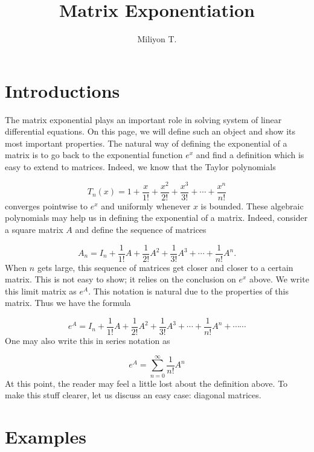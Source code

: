 \documentclass[11pt]{article}
\theoremstyle{definition}
\theoremstyle{plain}
\begin{document}
\clearpage

\title{Matrix Exponentiation}
\author{Miliyon T.}
\maketitle
\section{Introductions}

The matrix exponential plays an important role in solving system of linear differential equations. On this page, we will define such an object and show its most important properties. The natural way of defining the exponential of a matrix is to go back to the exponential function $e^x$ and find a definition which is easy to extend to matrices. Indeed, we know that the Taylor polynomials

\[T_n(x) = 1 + \frac{x}{1!}+ \frac{x^2}{2!}+ \frac{x^3}{3!}+\cdots+ \frac{x^n}{n!}\]
converges pointwise to $e^x$ and uniformly whenever $x$ is bounded. These algebraic polynomials may help us in defining the exponential of a matrix. Indeed, consider a square matrix $A$ and define the sequence of matrices

\[
A_n = I_n + \frac{1}{1!}A+ \frac{1}{2!}A^2+ \frac{1}{3!}A^3+\cdots+ \frac{1}{n!}A^n.
\]
When $n$ gets large, this sequence of matrices get closer and closer to a certain matrix. This is not easy to show; it relies on the conclusion on $e^x$ above. We write this limit matrix as $e^A$. This notation is natural due to the properties of this matrix. Thus we have the formula

\[
e^A = I_n + \frac{1}{1!}A+ \frac{1}{2!}A^2+ \frac{1}{3!}A^3+\cdots+ \frac{1}{n!}A^n + \cdots \cdots
\]
One may also write this in series notation as

\[
e^A = \sum_{n=0}^{\infty} \frac{1}{n!}A^n
\]
At this point, the reader may feel a little lost about the definition above. To make this stuff clearer, let us discuss an easy case: diagonal matrices.

\section{Examples}
\end{document}

